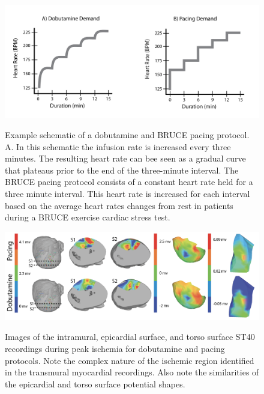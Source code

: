 \begin{figure}[htb]%
	\begin{center}
		{\includegraphics[width=\textwidth]
			{../Figures/DobutvsPacingProtocol.png}}
		\captionsetup{width = \textwidth}
		\caption{\small \label{fig:dobutvspacingprotocol} Example schematic of a dobutamine and BRUCE pacing protocol. A. In this schematic the infusion rate is increased every three minutes. The resulting heart rate can bee seen as a gradual curve that plateaus prior to the end of the three-minute interval. The BRUCE pacing protocol consists of a constant heart rate held for a three minute interval. This heart rate is increased for each interval based on the average heart rates changes from rest in patients during a BRUCE exercise cardiac stress test.}
	\end{center}
\end{figure}


\begin{figure}[htb]%
    \begin{center}
        {\includegraphics[width=\textwidth]
          {../Figures/fig2.png}}
        \captionsetup{width = \textwidth}
        \caption{\small \label{fig:dobutvspacing} Images of the
          intramural, epicardial surface, and torso surface ST40 recordings
          during peak ischemia for dobutamine and pacing protocols. Note the complex nature of the ischemic region identified in the transmural myocardial recordings. Also note the similarities of the epicardial and torso surface potential shapes. }
    \end{center}
\end{figure}


